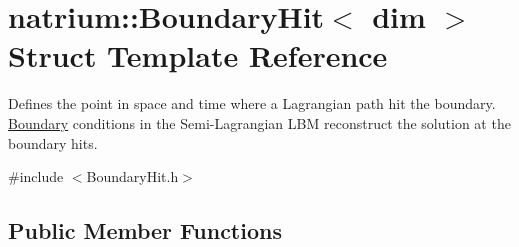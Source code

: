 \hypertarget{structnatrium_1_1BoundaryHit}{
\section{natrium::BoundaryHit$<$ dim $>$ Struct Template Reference}
\label{structnatrium_1_1BoundaryHit}
}


Defines the point in space and time where a Lagrangian path hit the boundary. \hyperlink{classnatrium_1_1Boundary}{Boundary} conditions in the Semi-\/Lagrangian LBM reconstruct the solution at the boundary hits.  


{\ttfamily \#include $<$BoundaryHit.h$>$}\subsection*{Public Member Functions}
